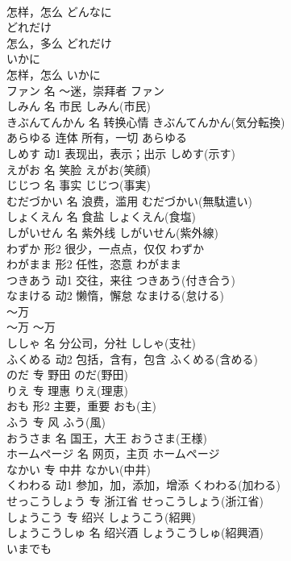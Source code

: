 \documentclass[8pt]{extreport}
\begin{document}
\begin{CJK}{UTF8}{min}
\\	怎样，怎么	どんなに	
\\	どれだけ	
\\	怎么，多么	どれだけ	
\\	いかに	
\\	怎样，怎么	いかに	
\\	ファン	名	～迷，崇拜者	ファン	
\\	しみん	名	市民	しみん(市民)	
\\	きぶんてんかん	名	转换心情	きぶんてんかん(気分転換)	
\\	あらゆる	连体	所有，一切	あらゆる	
\\	しめす	动1	表现出，表示；出示	しめす(示す)	
\\	えがお	名	笑脸	えがお(笑顔)	
\\	じじつ	名	事实	じじつ(事実)	
\\	むだづかい	名	浪费，滥用	むだづかい(無駄遣い)	
\\	しょくえん	名	食盐	しょくえん(食塩)	
\\	しがいせん	名	紫外线	しがいせん(紫外線)	
\\	わずか	形2	很少，一点点，仅仅	わずか	
\\	わがまま	形2	任性，恣意	わがまま	
\\	つきあう	动1	交往，来往	つきあう(付き合う)	
\\	なまける	动2	懒惰，懈怠	なまける(怠ける)	
\\	～万	
\\	～万	～万	
\\	ししゃ	名	分公司，分社	ししゃ(支社)	
\\	ふくめる	动2	包括，含有，包含	ふくめる(含める)	
\\	のだ	专	野田	のだ(野田)	
\\	りえ	专	理惠	りえ(理恵)	
\\	おも	形2	主要，重要	おも(主)	
\\	ふう	专	风	ふう(風)	
\\	おうさま	名	国王，大王	おうさま(王様)	
\\	ホームページ	名	网页，主页	ホームページ	
\\	なかい	专	中井	なかい(中井)	
\\	くわわる	动1	参加，加，添加，增添	くわわる(加わる)	
\\	せっこうしょう	专	浙江省	せっこうしょう(浙江省)	
\\	しょうこう	专	绍兴	しょうこう(紹興)	
\\	しょうこうしゅ	名	绍兴酒	しょうこうしゅ(紹興酒)	
\\	いまでも	

\end{CJK}
\end{document}
